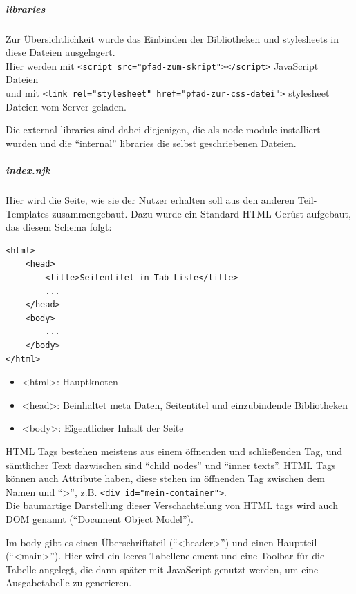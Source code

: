 \documentclass[12pt,pdftex,parskip=half]{scrartcl}
\begin{document}
                \subparagraph{libraries}
                Zur Übersichtlichkeit wurde das Einbinden der Bibliotheken und stylesheets in diese Dateien ausgelagert.\\
                Hier werden mit \lstinline{<script src="pfad-zum-skript"></script>} JavaScript Dateien\\ und mit \lstinline{<link rel="stylesheet" href="pfad-zur-css-datei">} stylesheet Dateien vom Server geladen.

                Die external libraries sind dabei diejenigen, die als node module installiert wurden und die "`internal"' libraries die selbst geschriebenen Dateien.


                \subparagraph{index.njk}
                Hier wird die Seite, wie sie der Nutzer erhalten soll aus den anderen Teil-Templates zusammengebaut. Dazu wurde ein Standard HTML Gerüst aufgebaut, das diesem Schema folgt:


                \begin{lstlisting}
<html>
    <head>
        <title>Seitentitel in Tab Liste</title>
        ...
    </head>
    <body>
        ...
    </body>
</html>
                \end{lstlisting}

                \begin{itemize}
                    \item <html>: Hauptknoten
                    \item <head>: Beinhaltet meta Daten, Seitentitel und einzubindende Bibliotheken
                    \item <body>: Eigentlicher Inhalt der Seite
                \end{itemize}

                HTML Tags bestehen meistens aus einem öffnenden und schließenden Tag, und sämtlicher Text dazwischen sind ``child nodes'' und ``inner texts''. HTML Tags können auch Attribute haben, diese stehen im öffnenden Tag zwischen dem Namen und ``>'', z.B. \lstinline{<div id="mein-container">}.\\
                Die baumartige Darstellung dieser Verschachtelung von HTML tags wird auch DOM genannt ("`Document Object Model"').

                Im body gibt es einen Überschriftsteil ("`<header>"') und einen Hauptteil ("`<main>"').
                Hier wird ein leeres Tabellenelement und eine Toolbar für die Tabelle angelegt, die dann später mit JavaScript genutzt werden, um eine Ausgabetabelle zu generieren.
\end{document}
